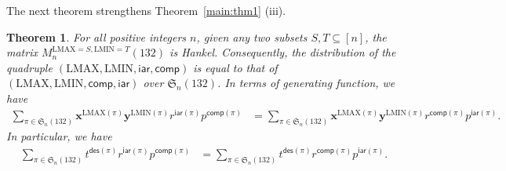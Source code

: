 \documentclass[12pt]{amsart}
\numberwithin{equation}{section}
\theoremstyle{plain}
\newtheorem{theorem}{Theorem}[section]
\theoremstyle{definition}
\def\des{\mathsf{des}}
\def\S{\mathfrak{S}}
\def\iar{\mathsf{iar}}
\def\comp{\mathsf{comp}}
\def\LMAX{\mathrm{LMAX}}
\def\LMIN{\mathrm{LMIN}}
\begin{document}
The next theorem strengthens Theorem~\ref{main:thm1} (iii).
\begin{theorem}\label{thm:132-symm}
For all positive integers $n$, given any two subsets $S,T\subseteq [n]$, the matrix $M_n^{\LMAX=S,\LMIN=T}(132)$ is Hankel. Consequently, the distribution of the quadruple $(\LMAX, \LMIN, \iar, \comp)$ is equal to that of $(\LMAX, \LMIN, \comp, \iar)$ over $\S_n(132)$. In terms of generating function, we have
\begin{align}\label{eq:132-LMAX-LMIN-iar-comp}
\sum_{\pi\in\S_n(132)}\mathbf{x}^{\LMAX(\pi)}\mathbf{y}^{\LMIN(\pi)}r^{\iar(\pi)}p^{\comp(\pi)} &= \sum_{\pi\in\S_n(132)}\mathbf{x}^{\LMAX(\pi)}\mathbf{y}^{\LMIN(\pi)}r^{\comp(\pi)}p^{\iar(\pi)}.
\end{align}
In particular, we have
\begin{align}\label{eq:132-des-iar-comp}
\sum_{\pi\in\S_n(132)}t^{\des(\pi)}r^{\iar(\pi)}p^{\comp(\pi)} &= \sum_{\pi\in\S_n(132)}t^{\des(\pi)}r^{\comp(\pi)}p^{\iar(\pi)}.
\end{align}
\end{theorem}
\end{document}
